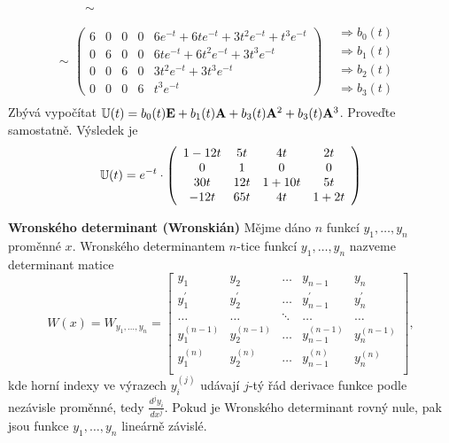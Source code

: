 \begin{equation*}
\begin{array}{l}
\begin{array}{ll}
\begin{array}{l}
    ~\\
    ~
  \end{array}
 \end{array}
\sim\\
\sim
 \begin{array}{ll}
  \left(\begin{array}{cccc|c}
    6 & 0 & 0 & 0 & 6e^{-t} + 6t e^{-t} + 3t^2 e^{-t} + t^3 e^{-t}\\
    0 & 6 & 0 & 0 & 6te^{-t} + 6t^2 e^{-t} + 3t^3 e^{-t}\\
    0 & 0 & 6 & 0 & 3t^2 e^{-t} + 3t^3 e^{-t}\\
    0 & 0 & 0 & 6 & t^3 e^{-t}
   \end{array}
  \right) & 
  \begin{array}{c}
    \Rightarrow b_0(t)\\
    \Rightarrow b_1(t)\\
    \Rightarrow b_2(t)\\
    \Rightarrow b_3(t)
  \end{array}
 \end{array}
\end{array}
\end{equation*}
Zbývá vypočítat ${\mathbb{U}}(t) = b_0(t){\bf E} + b_1(t){\bf A} + b_3(t){\bf A}^2 +b_{3}(t){\bf A}^{3}$. Proveďte samostatně. Výsledek je
\begin{equation*}
  {\mathbb{U}}(t) = e^{-t} \cdot \left(
    \begin{array}{cccc}
     1 -12t & 5t & 4t & 2t\\
     0 & 1 & 0 & 0\\
     30t & 12t & 1+10t & 5t\\
     -12t & 65t & 4t & 1 + 2t
    \end{array}\right)
\end{equation*}


{\bf Wronského determinant (Wronskián)}
Mějme dáno $n$ funkcí $y_1,\ldots,y_n$ proměnné $x$. Wronského determinantem $n$-tice funkcí  $y_1,\ldots,y_n$ nazveme determinant matice %
\[
 W(x) = W_{y_1,\ldots,y_n} = \left[\begin{array}{ccccc}
        y_1 & y_2 & \ldots & y_{n-1} & y_{n}\\
        y_1^{'} & y_2^{'} & \ldots & y_{n-1}^{'} & y_{n}^{'}\\
        \ldots & \ldots & \ddots & \ldots & \ldots\\
        y_1^{(n-1)} & y_2^{(n-1)} & \ldots & y_{n-1}^{(n-1)} & y_{n}^{(n-1)}\\
        y_1^{(n)} & y_2^{(n)} & \ldots & y_{n-1}^{(n)} & y_{n}^{(n)}\\
       \end{array}\right],
\]
kde horní indexy ve výrazech $y_i^{(j)}$ udávají $j$-tý řád derivace funkce podle nezávisle proměnné, tedy $\frac{d^jy_i}{dx^j}$. Pokud je Wronského determinant rovný nule, pak jsou funkce $y_1,\ldots,y_n$ lineárně závislé.

